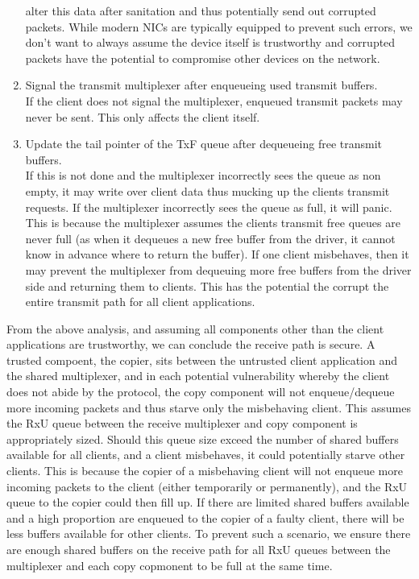 \begin{enumerate}
    alter this data after sanitation and thus potentially send out corrupted packets. While modern NICs are typically equipped to prevent
    such errors, we don't want to always assume the device itself is trustworthy and corrupted packets have the potential to compromise
    other devices on the network.
    \item Signal the transmit multiplexer after enqueueing used transmit buffers.\\
    If the client does not signal the multiplexer, enqueued transmit packets may never be sent. This only affects the client itself.
    \item Update the tail pointer of the TxF queue after dequeueing free transmit buffers.\\
    If this is not done and the multiplexer
    incorrectly sees the queue as non empty, it may write over client data thus mucking up the clients transmit requests. If
    the multiplexer incorrectly sees the queue as full, it will panic. This is because the multiplexer assumes the clients 
    transmit free queues are never full (as when it dequeues a new free buffer from the driver, it cannot know in advance where 
    to return the buffer). If one client misbehaves, then it may prevent the multiplexer from dequeuing more free buffers 
    from the driver side and returning them to clients. This has the potential the corrupt the entire transmit path for all
    client applications.
\end{enumerate}

From the above analysis, and assuming all components other than the client applications are trustworthy,
we can conclude the receive path is secure. A trusted compoent, the copier, sits between the untrusted client application
and the shared multiplexer, and in each potential vulnerability whereby the client does not abide by the protocol, the copy component
will not enqueue/dequeue more incoming packets and thus starve only the misbehaving client. This assumes the RxU queue between 
the receive multiplexer and copy component is appropriately sized. Should this queue size exceed the number of shared buffers
available for all clients, and a client misbehaves, it could potentially starve other clients. This is because the copier
of a misbehaving client will not enqueue more incoming packets to the client (either temporarily or permanently), and the RxU queue
to the copier could then fill up. If there are limited shared buffers available and a high proportion are enqueued to the copier
of a faulty client, there will be less buffers available for other clients. To prevent such a scenario, we ensure there are enough
shared buffers on the receive path for all RxU queues between the multiplexer and each copy copmonent to be full at the same time.\\

